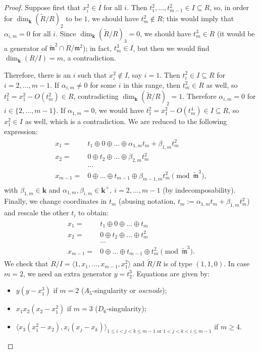 \documentclass{compositio}
\renewcommand{\k}{\mathbf k}
\newcommand{\m}{\mathfrak m}
\newcommand{\tR}{\widetilde{R}}
\newcommand{\tm}{\widetilde{\mathfrak m}}
\theoremstyle{plain}
\theoremstyle{definition}
\theoremstyle{remark}
\begin{document}
\begin{proof}
 Suppose first that $x_i^2\in I$ for all $i$. Then $t_1^2,\ldots,t_{m-1}^2\in I\subseteq R$, so, in order for $\dim_\k(\tR/R)_2$ to be $1$, we should have $t_m^2\notin R$; this would imply that $\alpha_{i,m}=0$ for all $i$. Since $\dim_\k(\tR/R)_3=0$, we should have $t_m^3\in R$ (it would be a generator of $\tm^2\cap R/\m^2$); in fact, $t_m^3\in I$, but then we would find $\dim_{\k}(R/I)=m$, a contradiction.
 
 Therefore, there is an $i$ such that $x_i^2\notin I$, say $i=1$. Then $t_i^2\in I\subseteq R$ for $i=2,\ldots,m-1$. If $\alpha_{i,m}\neq 0$ for some $i$ in this range, then $t_m^2\in R$ as well, so $t_1^2=x_1^2-O(t_m^2)\in R$, contradicting $\dim_\k(\tR/R)_2=1$. Therefore $\alpha_{i,m}=0$ for $i\in\{2,\ldots,m-1\}$. If $\alpha_{1,m}=0$, we would have $t_1^2=x_1^2-O(t_m^4)\in I\subseteq R$, so $x_1^2\in I$ as well, which is a contradiction. We are reduced to the following expression:
 \begin{align}\label{coordII-cs}
 \begin{split}
  x_1= & t_1\oplus0\oplus\ldots\oplus\alpha_{1,m}t_m+\beta_{1,m}t_m^2\\
  x_2= & 0\oplus t_2\oplus\ldots\oplus\beta_{2,m}t_m^2\\
  &\ldots\\
  x_{m-1}= & 0\oplus\ldots\oplus t_{m-1}\oplus \beta_{m-1,m}t_m^2 \pmod{\tm^3},
 \end{split}
 \end{align}
 with $\beta_{1,m}\in\k$ and $\alpha_{1,m},\beta_{i,m}\in\k^\times,\ i=2,\ldots,m-1$ (by indecomposability). Finally, we change coordinates in $t_m$ (abusing notation, $t_m:=\alpha_{1,m}t_m+\beta_{1,m}t_m^2$) and rescale the other $t_i$ to obtain:
 \begin{align}\label{coordII}
 \begin{split}
  x_1= & t_1\oplus0\oplus\ldots\oplus t_m\\
  x_2= & 0\oplus t_2\oplus\ldots\oplus t_m^2\\
  &\ldots\\
  x_{m-1}= & 0\oplus\ldots\oplus t_{m-1}\oplus t_m^2\pmod{\tm^3}.
 \end{split}
 \end{align}
 We check that $R/I=\langle 1,x_1,\ldots,x_{m-1},x_1^2\rangle$ and $\tR/R$ is of type $(1,1,0)$. In case $m=2$, we need an extra generator $y=t_2^3$. Equations are given by:
 \begin{itemize}
  \item $y(y-x_1^3)$ if $m=2$ ($A_5$-singularity or \emph{oscnode});
  \item $x_1x_2(x_2-x_1^2)$ if $m=3$ ($D_6$-singularity);
  \item $\langle x_3(x_1^2-x_2),x_i(x_j-x_k)\rangle_{1\leq i<j<k\leq m-1 \text{ or }1<j<k<i\leq m-1}$ if $m\geq 4$.
 \end{itemize}


\end{proof}
\end{document}
